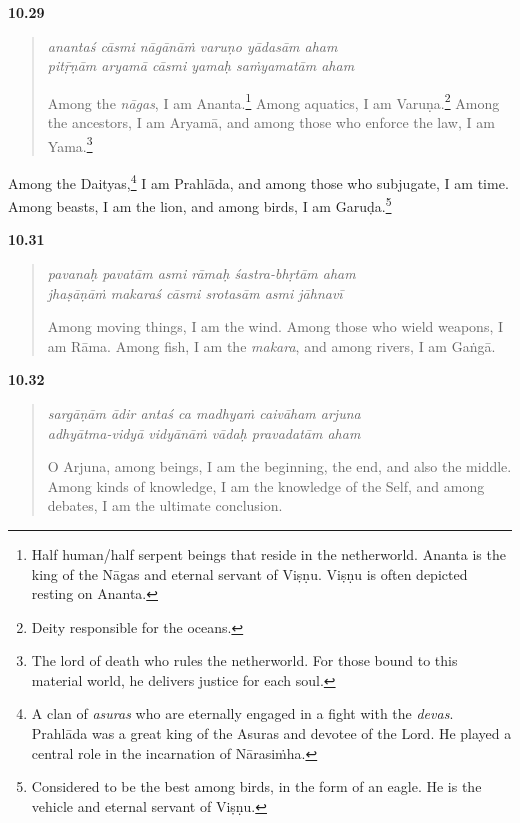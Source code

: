 \par\noindent\textbf{10.29}\par
\begin{verse}
\textit{anantaś cāsmi nāgānāṁ varuṇo yādasām aham} \\
\textit{pitṝṇām aryamā cāsmi yamaḥ saṁyamatām aham}

\noindent Among the \textit{nāgas}, I am Ananta.\footnote{Half human/half serpent beings that reside in the netherworld. Ananta is the king of the Nāgas and eternal servant of Viṣṇu. Viṣṇu is often depicted resting on Ananta.} Among aquatics, I am Varuṇa.\footnote{Deity responsible for the oceans.} Among the ancestors, I am Aryamā, and among those who enforce the law, I am Yama.\footnote{The lord of death who rules the netherworld. For those bound to this material world, he delivers justice for each soul.}
\end{verse}
\par


{Among the Daityas,\footnote{A clan of \textit{asuras} who are eternally engaged in a fight with the \textit{devas}. Prahlāda was a great king of the Asuras and devotee of the Lord. He played a central role in the incarnation of Nārasiṁha.} I am Prahlāda, and among those who subjugate, I am time. Among beasts, I am the lion, and among birds, I am Garuḍa.\footnote{Considered to be the best among birds, in the form of an eagle. He is the vehicle and eternal servant of Viṣṇu.}}


\par\noindent\textbf{10.31}\par
\begin{verse}
\textit{pavanaḥ pavatām asmi rāmaḥ śastra-bhṛtām aham} \\
\textit{jhaṣāṇāṁ makaraś cāsmi srotasām asmi jāhnavī}

\noindent Among moving things, I am the wind. Among those who wield weapons, I am Rāma. Among fish, I am the \textit{makara}, and among rivers, I am Gaṅgā.
\end{verse}
\par



\par\noindent\textbf{10.32}\par
\begin{verse}
\textit{sargāṇām ādir antaś ca madhyaṁ caivāham arjuna} \\
\textit{adhyātma-vidyā vidyānāṁ vādaḥ pravadatām aham}

\noindent O Arjuna, among beings, I am the beginning, the end, and also the middle. Among kinds of knowledge, I am the knowledge of the Self, and among debates, I am the ultimate conclusion.
\end{verse}
\par



